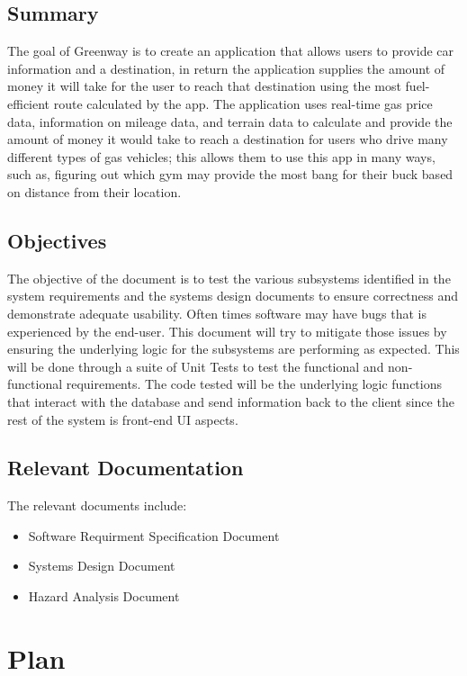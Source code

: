 \documentclass[12pt, titlepage]{article}
\begin{document}
\subsection{Summary}


The goal of Greenway is to create an application that allows users to provide car information
and a destination, in return the application supplies the amount of money it will take for
the user to reach that destination using the most fuel-efficient route calculated by the app.
The application uses real-time gas price data, information on mileage data, and terrain data
to calculate and provide the amount of money it would take to reach a destination for users
who drive many different types of gas vehicles; this allows them to use this app in many
ways, such as, figuring out which gym may provide the most bang for their buck based on
distance from their location.

\subsection{Objectives}

The objective of the document is to test the various subsystems identified in the system requirements and the systems design documents to ensure correctness and demonstrate adequate usability. 
Often times software may have
bugs that is experienced by the end-user. This document will try to mitigate those issues by
ensuring the underlying logic for the subsystems are performing as expected. This will be
done through a suite of Unit Tests to test the functional and non-functional requirements.
The code tested will be the underlying logic functions that interact with the database and
send information back to the client since the rest of the system is front-end UI aspects.


\subsection{Relevant Documentation}


The relevant documents include:
\begin{itemize}
\item Software Requirment Specification Document
\item Systems Design Document
\item Hazard Analysis Document
\end{itemize}


\section{Plan}
\end{document}
